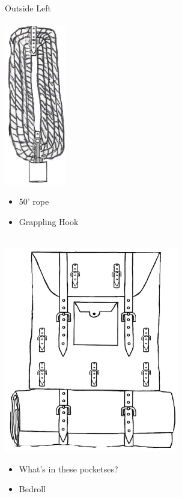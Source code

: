 \documentclass[11pt]{article}
\begin{document}
\begin{minipage}[t]{.248\textwidth}
    \normalsize{Outside Left}\\
    \\
    \includegraphics[height=7.0cm]{img/rope.png}\\
    \begin{normalsize}
        \begin{itemize}[topsep=0pt, itemsep=0pt, partopsep=0pt, parsep=0pt]
            \item 50' rope
            \item Grappling Hook
        \end{itemize}
        \end{normalsize}
\end{minipage}
\begin{minipage}[t]{.5\textwidth}
    \normalsize{\ }\\
    \includegraphics[height=9.0cm]{img/Backpack.png}\\
    \begin{normalsize}
        \begin{itemize}[topsep=0pt, itemsep=0pt, partopsep=0pt, parsep=0pt]
            \item What's in these pocketses?
            \item Bedroll
        \end{itemize}
        \end{normalsize}
\end{minipage}
\end{document}
